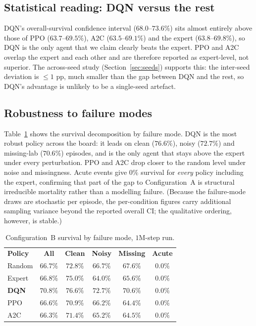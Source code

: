 \documentclass[11pt,a4paper]{article}
\newcommand{\tH}[1]{\textcolor{novagreen}{\textbf{#1}}}
\newcommand{\gmid}{\arrayrulecolor{novagreen}\midrule\arrayrulecolor{black}}
\begin{document}
\subsection{Statistical reading: DQN versus the rest}
\label{sec:statcheck}

DQN's overall-survival confidence interval ($68.0$--$73.6\%$) sits almost entirely
above those of PPO ($63.7$--$69.5\%$), A2C ($63.5$--$69.1\%$) and the expert
($63.8$--$69.8\%$), so DQN is the only agent that we claim clearly beats the
expert. PPO and A2C overlap the expert and each other and are therefore reported
as expert-level, not superior. The across-seed study
(Section~\ref{sec:seeds}) supports this: the inter-seed deviation is $\le1$ pp,
much smaller than the gap between DQN and the rest, so DQN's advantage is unlikely
to be a single-seed artefact.

\subsection{Robustness to failure modes}

Table~\ref{tab:robust} shows the survival decomposition by failure mode. DQN is
the most robust policy across the board: it leads on clean ($76.6\%$), noisy
($72.7\%$) and missing-lab ($70.6\%$) episodes, and is the only agent that stays
above the expert under every perturbation. PPO and A2C drop closer to the random
level under noise and missingness. Acute events give $0\%$ survival for
\emph{every} policy including the expert, confirming that part of the gap to
Configuration~A is structural irreducible mortality rather than a modelling
failure. (Because the failure-mode draws are stochastic per episode, the
per-condition figures carry additional sampling variance beyond the reported
overall CI; the qualitative ordering, however, is stable.)

\begin{table}[H]
\centering
\small
\begin{tabular}{lccccc}
\toprule
\tH{Policy} & \tH{All} & \tH{Clean} & \tH{Noisy} & \tH{Missing} & \tH{Acute} \\
\gmid
Random      & $66.7\%$ & $72.8\%$ & $66.7\%$ & $67.6\%$ & $0.0\%$ \\
Expert      & $66.8\%$ & $75.0\%$ & $64.0\%$ & $65.6\%$ & $0.0\%$ \\
\textbf{DQN}& $\mathbf{70.8\%}$ & $\mathbf{76.6\%}$ & $\mathbf{72.7\%}$ & $\mathbf{70.6\%}$ & $0.0\%$ \\
PPO         & $66.6\%$ & $70.9\%$ & $66.2\%$ & $64.4\%$ & $0.0\%$ \\
A2C         & $66.3\%$ & $71.4\%$ & $65.2\%$ & $64.5\%$ & $0.0\%$ \\
\bottomrule
\end{tabular}
\caption{Configuration~B survival by failure mode, $1$M-step run.}
\label{tab:robust}
\end{table}
\end{document}
